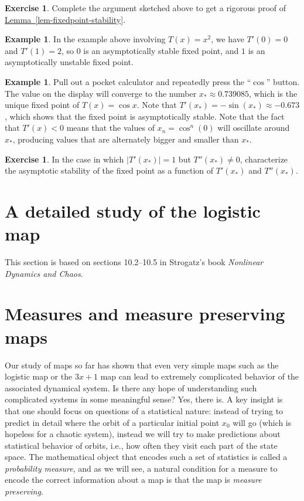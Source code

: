 \documentclass[11pt]{report}
\theoremstyle{plain}
\theoremstyle{definition}
\newtheorem{example}[thm]{Example}
\newtheorem{xexercise}[thm]{Exercise}
\begin{document}
\begin{xexercise}
Complete the argument sketched above to get a rigorous
proof of \hyperref[lem-fixedpoint-stability]{Lemma~\ref*{lem-fixedpoint-stability}}.
\end{xexercise}

\begin{example}
In the example above involving $T(x)=x^2$, we have
$T'(0)=0$ and $T'(1)=2$, so $0$ is an asymptotically
stable fixed point, and $1$ is an asymptotically
unstable fixed point.
\end{example}

\begin{example}
Pull out a pocket calculator and repeatedly press the
``$\cos$'' button. The value on the display will
converge to the number $x_*\approx0.739085$, which is
the unique fixed point of $T(x)=\cos x$. Note that
$T'(x_*)=-\sin(x_*)\approx -0.673$, which shows that
the fixed point is asymptotically stable. Note that
the fact that $T'(x)<0$ means that the values of
$x_n=\cos^n(0)$ will oscillate around $x_*$, producing
values that are alternately bigger and smaller than
$x_*$.
\end{example}

\begin{xexercise}
In the case in which $|T'(x_*)|=1$ but
$T''(x_*)\neq 0$, characterize the asymptotic
stability of the fixed point as a function of
$T'(x_*)$ and $T''(x_*)$.
\end{xexercise}

\section{A detailed study of the logistic map}

This section is based on sections 10.2--10.5 in
Strogatz's book \emph{Nonlinear Dynamics and Chaos}.

\section{Measures and measure preserving maps}

Our study of maps so far has shown that even very
simple maps such as the logistic map or the $3x+1$ map
can lead to extremely complicated behavior of the
associated dynamical system. Is there any hope of
understanding such complicated systems in some
meaningful sense? Yes, there is. A key insight is that
one should focus on questions of a statistical nature:
instead of trying to predict in detail where the orbit
of a particular initial point $x_0$ will go (which is
hopeless for a chaotic system), instead we will try to
make predictions about statistical behavior of orbits,
i.e., how often they visit each part of the state
space. The mathematical object that encodes such a set
of statistics is called a \emph{probability measure}, and
as we will see, a natural condition for a measure to
encode the correct information about a map is that the
map is \emph{measure preserving}.
\end{document}
